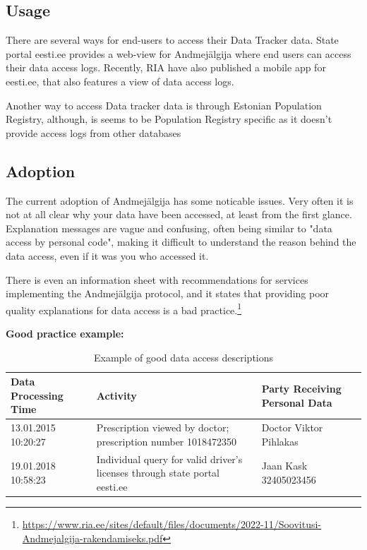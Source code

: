 \subsection{Usage}
There are several ways for end-users to access their Data Tracker data. State portal eesti.ee provides a web-view for Andmejälgija where end users can access their data access logs. Recently, RIA have also published a mobile app for eesti.ee, that also features a view of data access logs. 

Another way to access Data tracker data is through Estonian Population Registry, although, is seems to be Population Registry specific as it doesn't provide access logs from other databases



\subsection{Adoption}
The current adoption of Andmejälgija has some noticable issues. Very often it is not at all clear why your data have been accessed, at least from the first glance. Explanation messages are vague and confusing, often being similar to "data access by personal code", making it difficult to understand the reason behind the data access, even if it was you who accessed it.

There is even an information sheet with recommendations for services implementing the Andmejälgija protocol, and it states that providing poor quality explanations for data access is a bad practice.\footnote{\url{https://www.ria.ee/sites/default/files/documents/2022-11/Soovitusi-Andmejalgija-rakendamiseks.pdf}} 

\textbf{Good practice example:}

\begin{table}[H]
\centering
\begin{tabular}{|p{3cm}|p{6cm}|p{4cm}|}
\hline
\textbf{Data Processing Time} & \textbf{Activity} & \textbf{Party Receiving Personal Data} \\
\hline
13.01.2015 10:20:27 & Prescription viewed by doctor; prescription number 1018472350 & Doctor Viktor Pihlakas \\
\hline
19.01.2018 10:58:23 & Individual query for valid driver's licenses through state portal eesti.ee & Jaan Kask 32405023456 \\
\hline
\end{tabular}
\caption{Example of good data access descriptions}
\end{table}

